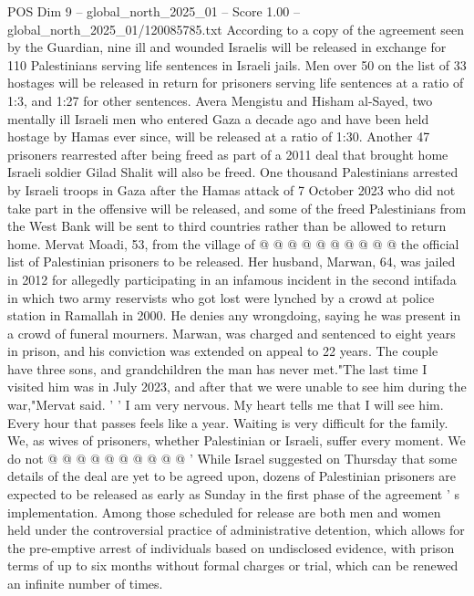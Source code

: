 \begin{textsample}{POS Dim 9 – global\_north\_2025\_01 – Score 1.00 – global\_north\_2025\_01/120085785.txt}  \label{ex:f9_pos_352}
According to a copy of the agreement seen by the Guardian, nine ill and wounded Israelis will be released in exchange for 110 Palestinians serving life sentences in Israeli jails.
Men over 50 on the list of 33 hostages will be released in return for prisoners serving life sentences at a ratio of 1:3, and 1:27 for other sentences.
Avera Mengistu and Hisham al-Sayed, two mentally ill Israeli men who entered Gaza a decade ago and have been held hostage by Hamas ever since, will be released at a ratio of 1:30.
Another 47 prisoners rearrested after being freed as part of a 2011 deal that brought home Israeli soldier Gilad Shalit will also be freed.
One thousand Palestinians arrested by Israeli troops in Gaza after the Hamas attack of 7 October 2023 who did not take part in the offensive will be released, and some of the freed Palestinians from the West Bank will be sent to third countries rather than be allowed to return home.
Mervat Moadi, 53, from the village of @ @ @ @ @ @ @ @ @ @ the official list of Palestinian prisoners to be released.
Her husband, Marwan, 64, was jailed in 2012 for allegedly participating in an infamous incident in the second intifada in which two army reservists who got lost were lynched by a crowd at police station in Ramallah in 2000.
He denies any wrongdoing, saying he was present in a crowd of funeral mourners.
Marwan, was charged and sentenced to eight years in prison, and his conviction was extended on appeal to 22 years.
The couple have three sons, and grandchildren the man has never met."The last time I visited him was in July 2023, and after that we were unable to see him during the war,"Mervat said. ' ' I am very nervous.
My heart tells me that I will see him.
Every hour that passes feels like a year.
Waiting is very difficult for the family.
We, as wives of prisoners, whether Palestinian or Israeli, suffer every moment.
We do not @ @ @ @ @ @ @ @ @ @ ' While Israel suggested on Thursday that some details of the deal are yet to be agreed upon, dozens of Palestinian prisoners are expected to be released as early as Sunday in the first phase of the agreement ' s implementation.
Among those scheduled for release are both men and women held under the controversial practice of administrative detention, which allows for the pre-emptive arrest of individuals based on undisclosed evidence, with prison terms of up to six months without formal charges or trial, which can be renewed an infinite number of times.

\end{textsample}
